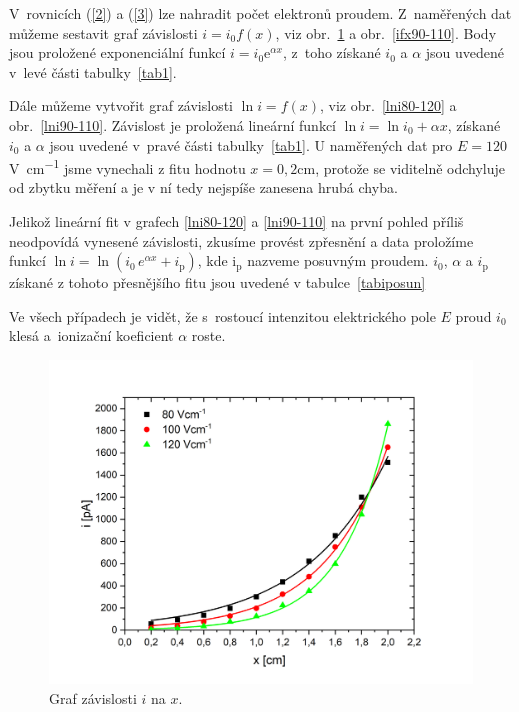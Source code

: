 \documentclass[a4paper,12pt]{article}
\newcommand{\e}{\text{e}}
\begin{document}
V~rovnicích (\ref{2}) a (\ref{3}) lze nahradit počet elektronů proudem. 
Z~naměřených dat můžeme sestavit graf závislosti $i = i_0 f(x)$, viz 
obr.~\ref{ifx80-120} a obr.~\ref{ifx90-110}. Body jsou proložené exponenciální funkcí $i = i_0 \e^{\alpha 
x}$, z~toho získané $i_0$ a $\alpha$ jsou uvedené v~levé části 
tabulky~\ref{tab1}.

Dále můžeme vytvořit graf závislosti $\ln i = f(x)$, viz 
obr.~\ref{lni80-120} a obr.~\ref{lni90-110}. Závislost je proložená lineární funkcí $\ln i =\ln i_0 + \alpha x$, 
získané $i_0$ a $\alpha$ jsou uvedené v~pravé části tabulky~\ref{tab1}. U naměřených dat pro $E = 120$ \si{\volt\per\centi\meter} jsme vynechali z fitu hodnotu $x = 0,2 \si{\centi\meter}$, protože se viditelně odchyluje od zbytku měření a je v ní tedy nejspíše zanesena hrubá chyba.

Jelikož lineární fit v grafech \ref{lni80-120} a \ref{lni90-110} na první pohled příliš neodpovídá vynesené závislosti, zkusíme provést zpřesnění a data proložíme funkcí $\ln i =\ln (i_0\,e^{\alpha x} + i_\text{p})$, kde i$_\text{p}$ nazveme posuvným proudem. $i_0$, $\alpha$ a $i_\text{p}$ získané z tohoto přesnějšího fitu jsou uvedené v tabulce~\ref{tabiposun}

Ve všech případech je vidět, že s~rostoucí intenzitou elektrického pole $E$ proud $i_0$ klesá a~ionizační koeficient $\alpha$ roste.

\begin{figure}[h!]
	\centering
	\includegraphics[width=145mm]{ifx80-120.png}
	\caption{Graf závislosti $i$ na $x$.}
	\label{ifx80-120}
\end{figure}
\end{document}
